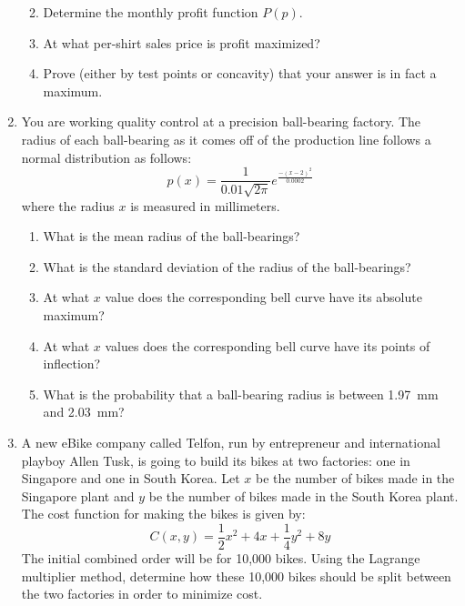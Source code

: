 \documentclass[letterpaper,12pt,fleqn]{article}
\begin{document}
\begin{enumerate}[left=0pt]
\begin{enumerate}
    \vspace{1in}

  \item Determine the monthly profit function \(P(p)\).

    \vspace{1.25in}

  \item At what per-shirt sales price is profit maximized?

    \vspace{2in}

  \item Prove (either by test points or concavity) that your answer is in fact a maximum.
  \end{enumerate}

  \newpage

\item You are working quality control at a precision ball-bearing factory.  The radius of each ball-bearing as it comes off of
  the production line follows a normal distribution as follows:
  \[p(x)=\frac{1}{0.01\sqrt{2\pi}}e^{\frac{-(x-2)^2}{0.0002}}\]
  where the radius \(x\) is measured in millimeters.
  \begin{enumerate}
  \item What is the mean radius of the ball-bearings?

    \vspace{1in}

  \item What is the standard deviation of the radius of the ball-bearings?

    \vspace{1in}

  \item At what \(x\) value does the corresponding bell curve have its absolute maximum?

    \vspace{1in}

  \item At what \(x\) values does the corresponding bell curve have its points of inflection?

    \vspace{1in}

  \item What is the probability that a ball-bearing radius is between \SI{1.97}{mm} and \SI{2.03}{mm}?
  \end{enumerate}

  \newpage

\item A new eBike company called Telfon, run by entrepreneur and international playboy Allen Tusk, is going to build
  its bikes at two factories: one in Singapore and one in South Korea.  Let \(x\) be the number of bikes made in the
  Singapore plant and \(y\) be the number of bikes made in the South Korea plant.  The cost function for making the bikes is
  given by:
  \[C(x,y)=\frac{1}{2}x^2+4x+\frac{1}{4}y^2+8y\]
  The initial combined order will be for 10,000 bikes.  Using the Lagrange multiplier method, determine how these 10,000 bikes
  should be split between the two factories in order to minimize cost.


\end{enumerate}
\end{document}
